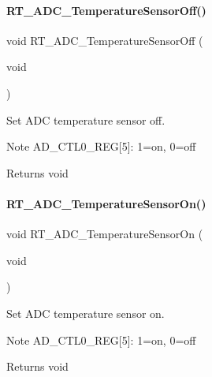 \paragraph{\texorpdfstring{R\+T\+\_\+\+A\+D\+C\+\_\+\+Temperature\+Sensor\+Off()}{RT\_ADC\_TemperatureSensorOff()}}
{\footnotesize\ttfamily void R\+T\+\_\+\+A\+D\+C\+\_\+\+Temperature\+Sensor\+Off (\begin{DoxyParamCaption}\item[{void}]{ }\end{DoxyParamCaption})}



Set A\+DC temperature sensor off. 

\begin{DoxyNote}{Note}
A\+D\+\_\+\+C\+T\+L0\+\_\+\+R\+EG\mbox{[}5\mbox{]}\+: 1=on, 0=off 
\end{DoxyNote}
\begin{DoxyReturn}{Returns}
void 
\end{DoxyReturn}
\mbox{\label{a00002_afd0ecdb5dcb37d2a26bd85fb060ee15b}} 
\paragraph{\texorpdfstring{R\+T\+\_\+\+A\+D\+C\+\_\+\+Temperature\+Sensor\+On()}{RT\_ADC\_TemperatureSensorOn()}}
{\footnotesize\ttfamily void R\+T\+\_\+\+A\+D\+C\+\_\+\+Temperature\+Sensor\+On (\begin{DoxyParamCaption}\item[{void}]{ }\end{DoxyParamCaption})}



Set A\+DC temperature sensor on. 

\begin{DoxyNote}{Note}
A\+D\+\_\+\+C\+T\+L0\+\_\+\+R\+EG\mbox{[}5\mbox{]}\+: 1=on, 0=off 
\end{DoxyNote}
\begin{DoxyReturn}{Returns}
void 
\end{DoxyReturn}
\mbox{\label{a00002_afa1d06c9b0f775905f17e2395cd0ce6f}} 
